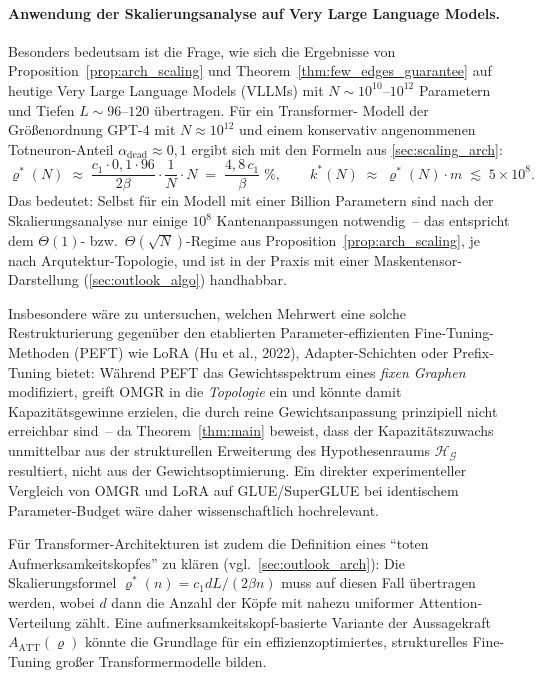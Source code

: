 ﻿\documentclass[12pt, a4paper, openany]{report}
\newcommand{\calG}{\mathcal{G}}
\newcommand{\calH}{\mathcal{H}}
\begin{document}
\paragraph{Anwendung der Skalierungsanalyse auf Very Large Language Models.}
Besonders bedeutsam ist die Frage, wie sich die Ergebnisse von
Proposition~\ref{prop:arch_scaling} und Theorem~\ref{thm:few_edges_guarantee}
auf heutige Very Large Language Models (VLLMs) mit $N \sim 10^{10}$--$10^{12}$
Parametern und Tiefen $L \sim 96$--$120$ übertragen.  Für ein Transformer-
Modell der Größenordnung GPT-4 mit $N \approx 10^{12}$ und einem konservativ
angenommenen Totneuron-Anteil $\alpha_{\mathrm{dead}} \approx 0{,}1$ ergibt
sich mit den Formeln aus \cref{sec:scaling_arch}:
\[
  \varrho^*(N)
  \;\approx\; \frac{c_1 \cdot 0{,}1 \cdot 96}{2\beta}
  \cdot \frac{1}{N} \cdot N
  \;=\; \frac{4{,}8\,c_1}{\beta}\;\%,
  \qquad
  k^*(N) \;\approx\; \varrho^*(N)\cdot m \;\lesssim\; 5 \times 10^{8}.
\]
Das bedeutet: Selbst für ein Modell mit einer Billion Parametern sind nach
der Skalierungsanalyse nur einige $10^8$ Kanten\-anpassungen notwendig~--
das entspricht dem $\Theta(1)$- bzw.\ $\Theta(\sqrt{N})$-Regime aus
Proposition~\ref{prop:arch_scaling}, je nach Arqutektur-Topologie, und ist
in der Praxis mit einer Masken\-tensor-Darstellung (\cref{sec:outlook_algo})
handhabbar.

Insbesondere wäre zu untersuchen, welchen Mehrwert eine solche Restrukturierung
gegenüber den etablierten Parameter-effizienten Fine-Tuning-Methoden (PEFT)
wie LoRA (Hu et al., 2022), Adapter-Schichten oder Prefix-Tuning bietet:
Während PEFT das Gewichtsspektrum eines \emph{fixen Graphen} modifiziert,
greift OMGR in die \emph{Topologie} ein und könnte damit Kapazitätsgewinne
erzielen, die durch reine Gewichts\-anpassung prinzipiell nicht erreichbar
sind~-- da Theorem~\ref{thm:main} beweist, dass der Kapazitätszuwachs
unmittelbar aus der strukturellen Erweiterung des Hypothesenraums
$\calH_{\calG}$ resultiert, nicht aus der Gewichtsoptimierung.  Ein
direkter experimenteller Vergleich von OMGR und LoRA auf GLUE/SuperGLUE
bei identischem Parameter-Budget wäre daher wissenschaftlich hochrelevant.

Für Transformer-Architekturen ist zudem die Definition eines ``toten
Aufmerksamkeitskopfes'' zu klären (vgl.\ \cref{sec:outlook_arch}): Die
Skalierungsformel $\varrho^*(n) = c_1 dL / (2\beta n)$ muss auf diesen
Fall übertragen werden, wobei $d$ dann die Anzahl der Köpfe mit nahezu
uniformer Attention-Verteilung zählt.  Eine aufmerksamkeitskopf-basierte
Variante der Aussagekraft $A_{\mathrm{ATT}}(\varrho)$ könnte die
Grundlage für ein effizienzoptimiertes, strukturelles Fine-Tuning großer
Transformermodelle bilden.
\end{document}
